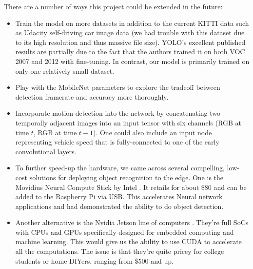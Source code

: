 \documentclass{article}
\begin{document}
There are a number of ways this project could be extended in the future:
\begin{itemize}
\item Train the model on more datasets in addition to the current KITTI data such as Udacity self-driving car image data (we had trouble with this dataset due to its high resolution and thus massive file size). YOLO's excellent published results are partially due to the fact that the authors trained it on both VOC 2007 and 2012 with fine-tuning. In contrast, our model is primarily trained on only one relatively small dataset.

\item Play with the MobileNet parameters to explore the tradeoff between detection framerate and accuracy more thoroughly.

\item Incorporate motion detection into the network by concatenating two temporally adjacent images into an input tensor with six channels (RGB at time $t$, RGB at time $t-1$). One could also include an input node representing vehicle speed that is fully-connected to one of the early convolutional layers.

\item To further speed-up the hardware, we came across several compelling, low-cost solutions for deploying object recognition to the edge. One is the Movidius Neural Compute Stick by Intel \cite{Movidius_NCS}. It retails for about \$80 and can be added to the Raspberry Pi via USB. This accelerates Neural network applications and had demonstrated the ability to do object detection.

\item Another alternative is the Nvidia Jetson line of computers \cite{Nvidia_Tegra}. They're full SoCs with CPUs and GPUs specifically designed for embedded computing and machine learning. This would give us the ability to use CUDA to accelerate all the computations. The issue is that they're quite pricey for college students or home DIYers, ranging from \$500 and up. 
\end{itemize}


\end{document}
